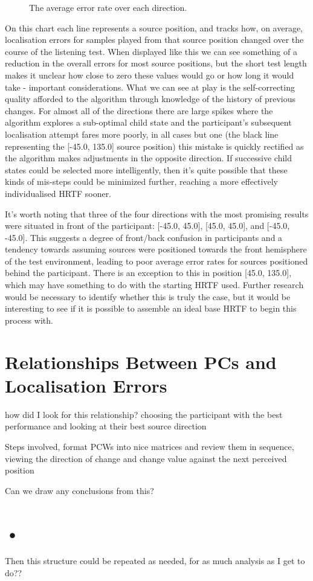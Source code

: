 \begin{figure}
	\caption{The average error rate over each direction.}
\end{figure}

On this chart each line represents a source position, and tracks how, on average, localisation errors for samples played from that source position changed over the course of the listening test. When displayed like this we can see something of a reduction in the overall errors for most source positions, but the short test length makes it unclear how close to zero these values would go or how long it would take - important considerations. What we can see at play is the self-correcting quality afforded to the algorithm through knowledge of the history of previous changes. For almost all of the directions there are large spikes where the algorithm explores a sub-optimal child state and the participant's subsequent localisation attempt fares more poorly, in all cases but one (the black line representing the [-45.0, 135.0] source position) this mistake is quickly rectified as the algorithm makes adjustments in the opposite direction. If successive child states could be selected more intelligently, then it's quite possible that these kinds of mis-steps could be minimized further, reaching a more effectively individualised HRTF sooner.

It's worth noting that three of the four directions with the most promising results were situated in front of the participant: [-45.0, 45.0], [45.0, 45.0], and [-45.0, -45.0]. This suggests a degree of front/back confusion in participants and a tendency towards assuming sources were positioned towards the front hemisphere of the test environment, leading to poor average error rates for sources positioned behind the participant. There is an exception to this in position [45.0, 135.0], which may have something to do with the starting HRTF used. Further research would be necessary to identify whether this is truly the case, but it would be interesting to see if it is possible to assemble an ideal base HRTF to begin this process with.

\section{Relationships Between PCs and Localisation Errors}
how did I look for this relationship? choosing the participant with the best performance and looking at their best source direction 

\bigskip

Steps involved, format PCWs into nice matrices and review them in sequence, viewing the direction of change and change value against the next perceived position

\bigskip 

Can we draw any conclusions from this? 

\section{•}
Then this structure could be repeated as needed, for as much analysis as I get to do??